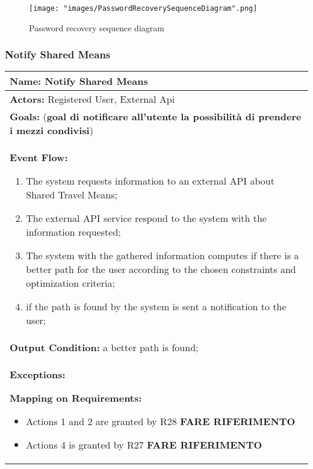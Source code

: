 \begin{figure}[H]
\begin{center}
\texttt{[image: "images/PasswordRecoverySequenceDiagram".png]}
\caption{Password recovery sequence diagram}
\label{img:seqDiagrPasswordRecovery}
\end{center}
\end{figure}

\subsubsection{Notify Shared Means}\label{usecase:Notify Shared Means}
\begin{longtable}{|p{14cm}|} \hline
\textbf{Name:} Notify Shared Means \\ \hline
\textbf{Actors:} Registered User, External Api \\ \hline
\textbf{Goals:} (\textbf{goal di notificare all'utente la possibilità di prendere i mezzi condivisi})\\ \hline

\textbf{Event Flow:}
\begin{enumerate}
\item The system requests information to an external API about Shared Travel Means;
\item The external API service respond to the system with the information requested;
\item The system with the gathered information computes if there is a better path for the user according to the chosen constraints and optimization criteria;
\item if the path is found by the system is sent a notification to the user;
\end{enumerate}
\\ \hline

\textbf{Output Condition:} a better path is found; \\ \hline

\textbf{Exceptions:}

\textbf{Mapping on Requirements:}
\begin{itemize}
\item Actions 1 and 2 are granted by R28 \textbf{FARE RIFERIMENTO}
\item Actions 4 is granted by R27 \textbf{FARE RIFERIMENTO}
\end{itemize}  \\ \hline

\end{longtable}

